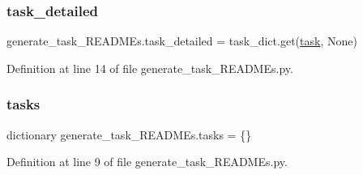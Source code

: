 \subsubsection{\texorpdfstring{task\+\_\+detailed}{task\_detailed}}
{\footnotesize\ttfamily generate\+\_\+task\+\_\+\+R\+E\+A\+D\+M\+Es.\+task\+\_\+detailed = task\+\_\+dict.\+get(\textquotesingle{}\hyperlink{namespacegenerate__task__READMEs_a1cd96208f46b10658c7fda64585ee590}{task}\textquotesingle{}, None)}



Definition at line 14 of file generate\+\_\+task\+\_\+\+R\+E\+A\+D\+M\+Es.\+py.

\mbox{\label{namespacegenerate__task__READMEs_a8f4da8ba04584af52e0e9e2f209245c2}} 
\subsubsection{\texorpdfstring{tasks}{tasks}}
{\footnotesize\ttfamily dictionary generate\+\_\+task\+\_\+\+R\+E\+A\+D\+M\+Es.\+tasks = \{\}}



Definition at line 9 of file generate\+\_\+task\+\_\+\+R\+E\+A\+D\+M\+Es.\+py.

